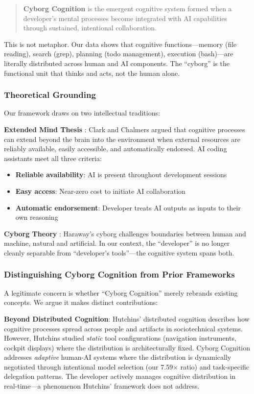 \documentclass{ntlabs-preprint}
\begin{document}
\begin{quote}
\textbf{Cyborg Cognition} is the emergent cognitive system formed when a developer's mental processes become integrated with AI capabilities through sustained, intentional collaboration.
\end{quote}

This is not metaphor. Our data shows that cognitive functions---memory (file reading), search (grep), planning (todo management), execution (bash)---are literally distributed across human and AI components. The ``cyborg'' is the functional unit that thinks and acts, not the human alone.

\subsubsection{Theoretical Grounding}

Our framework draws on two intellectual traditions:

\textbf{Extended Mind Thesis} \citep{clark1998extended}: Clark and Chalmers argued that cognitive processes can extend beyond the brain into the environment when external resources are reliably available, easily accessible, and automatically endorsed. AI coding assistants meet all three criteria:
\begin{itemize}
    \item \textbf{Reliable availability}: AI is present throughout development sessions
    \item \textbf{Easy access}: Near-zero cost to initiate AI collaboration
    \item \textbf{Automatic endorsement}: Developer treats AI outputs as inputs to their own reasoning
\end{itemize}

\textbf{Cyborg Theory} \citep{haraway1991cyborg}: Haraway's cyborg challenges boundaries between human and machine, natural and artificial. In our context, the ``developer'' is no longer cleanly separable from ``developer's tools''---the cognitive system spans both.

\subsubsection{Distinguishing Cyborg Cognition from Prior Frameworks}

A legitimate concern is whether ``Cyborg Cognition'' merely rebrands existing concepts. We argue it makes distinct contributions:

\textbf{Beyond Distributed Cognition}: Hutchins' \citep{hutchins1995cognition} distributed cognition describes how cognitive processes spread across people and artifacts in sociotechnical systems. However, Hutchins studied \textit{static} tool configurations (navigation instruments, cockpit displays) where the distribution is architecturally fixed. Cyborg Cognition addresses \textit{adaptive} human-AI systems where the distribution is dynamically negotiated through intentional model selection (our 7.59$\times$ ratio) and task-specific delegation patterns. The developer actively manages cognitive distribution in real-time---a phenomenon Hutchins' framework does not address.
\end{document}
